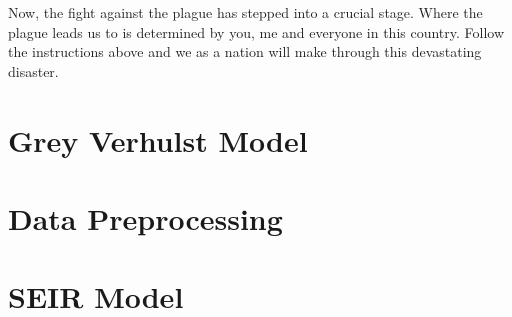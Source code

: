 \documentclass[12pt]{mcmthesis}
\begin{document}
Now, the fight against the plague has stepped into a crucial stage. Where the plague leads us to is determined by you, me and everyone in this country. Follow the instructions above and we as a nation will make through this devastating disaster.

\newpage
\printbibliography
\newpage

\begin{appendices}
\section{Grey Verhulst Model}

\section{Data Preprocessing}

\section{SEIR Model}

\end{appendices}
\end{document}
